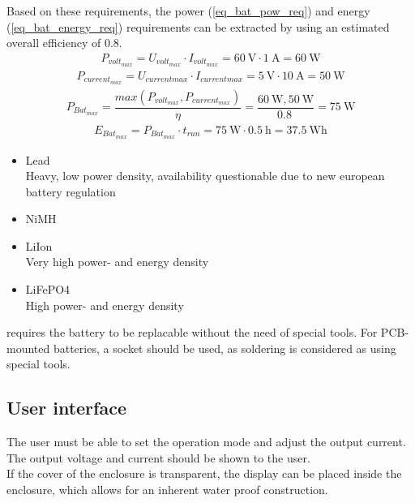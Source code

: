 Based on these requirements, the power (\autoref{eq_bat_pow_req}) and energy (\autoref{eq_bat_energy_req}) requirements can be extracted by using an estimated overall efficiency of 0.8. 
\begin{align}
    P_{volt_{max}}
    = U_{volt_{max}} \cdot I_{volt_{max}}
    = \qty{60}{\volt} \cdot \qty{1}{\ampere}
    = \qty{60}{\watt}
\end{align}
\begin{align}
    P_{current_{max}}
    = U_{current{max}} \cdot I_{current{max}}
    = \qty{5}{\volt} \cdot \qty{10}{\ampere}
    = \qty{50}{\watt}
\end{align}
\begin{align}
    \label{eq_bat_pow_req}
    P_{Bat_{max}}
    = \dfrac{max\left(P_{volt_{max}}, P_{current_{max}}\right)}{\eta}
    = \dfrac{\qty{60}{\watt}, \qty{50}{\watt}}{\qty{0.8}{}}
    = \qty{75}{\watt}
\end{align}
\begin{align}
    \label{eq_bat_energy_req}
    E_{Bat_{max}}
    = P_{Bat_{max}} \cdot t_{run}
    = \qty{75}{\watt} \cdot \qty{0.5}{\hour}
    = \qty{37.5}{\watt\hour}
\end{align}

\begin{itemize}
    \item Lead
        \\
        Heavy, low power density, availability questionable due to new european battery regulation
    \item NiMH
        \\
    \item LiIon
        \\
        Very high power- and energy density
    \item LiFePO4
        \\
        High power- and energy density
\end{itemize}

 requires the battery to be replacable without the need of special tools. For PCB-mounted batteries, a socket should be used, as soldering is considered as using special tools. 

\subsection{User interface}
The user must be able to set the operation mode and adjust the output current. The output voltage and current should be shown to the user. \\
If the cover of the enclosure is transparent, the display can be placed inside the enclosure, which allows for an inherent water proof construction. 


